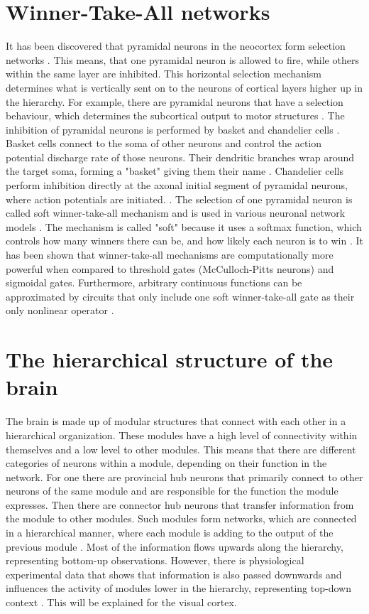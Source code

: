 \section{Winner-Take-All networks}

It has been discovered that pyramidal neurons in the neocortex form selection networks \citep{softWTA}. This means, that one pyramidal neuron is allowed to fire, while others within the same layer are inhibited. This horizontal selection mechanism determines what is vertically sent on to the neurons of cortical layers higher up in the hierarchy. For example, there are pyramidal neurons that have a selection behaviour, which determines the subcortical output to motor structures \citep{softWTA}. The inhibition of pyramidal neurons is performed by basket and chandelier cells \citep{softWTA}. Basket cells connect to the soma of other neurons and control the action potential discharge rate of those neurons. Their dendritic branches wrap around the target soma, forming a "basket" giving them their name \citep{basketCells}. Chandelier cells perform inhibition directly at the axonal initial segment of pyramidal neurons, where action potentials are initiated. \citep{chandelierCells}. The selection of one pyramidal neuron is called soft winner-take-all mechanism and is used in various neuronal network models \citep{softWTA}. The mechanism is called "soft" because it uses a softmax function, which controls how many winners there can be, and how likely each neuron is to win \citep{handbookWTA}. It has been shown that winner-take-all mechanisms are computationally more powerful when compared to threshold gates (McCulloch-Pitts neurons) and sigmoidal gates. Furthermore, arbitrary continuous functions can be approximated by circuits that only include one soft winner-take-all gate as their only nonlinear operator \citep{WTAPower}.

\section{The hierarchical structure of the brain}

The brain is made up of modular structures that connect with each other in a hierarchical organization. These modules have a high level of connectivity within themselves and a low level to other modules. This means that there are different categories of neurons within a module, depending on their function in the network. For one there are provincial hub neurons that primarily connect to other neurons of the same module and are responsible for the function the module expresses. Then there are connector hub neurons that transfer information from the module to other modules. Such modules form networks, which are connected in a hierarchical manner, where each module is adding to the output of the previous module \citep{hierarchicalBrain}.
Most of the information flows upwards along the hierarchy, representing bottom-up observations. However, there is physiological experimental data that shows that information is also passed downwards and influences the activity of modules lower in the hierarchy, representing top-down context \citep{HierachicalBayesVisualCortex}. This will be explained for the visual cortex.


